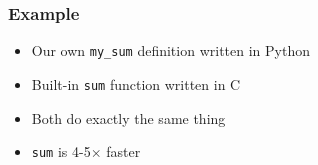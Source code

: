 \begin{frame}
  \frametitle{Example}
  \begin{itemize}
    \item Our own \texttt{my\_sum} definition written in Python
    \item Built-in \texttt{sum} function written in C
    \item Both do exactly the same thing
    \item \texttt{sum} is 4-5$\times$ faster
  \end{itemize}
\end{frame}